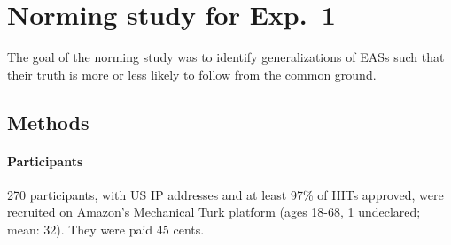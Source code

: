 \documentclass[11pt,fleqn]{article}
\newcommand{\6}{\mbox{$[\hspace*{-.6mm}[$}}
\newcommand{\9}{\mbox{$]\hspace*{-.6mm}]$}}
\begin{document}
%
%
%
%
%
%
%
%
%
%


\section{Norming study for Exp.~1}\label{a-norming}

The goal of the norming study was to identify generalizations of EASs such that their truth is more or less likely to follow from the common ground. 

\subsection{Methods}

\paragraph{Participants} 270 participants, with US IP addresses and at least 97\% of HITs approved, were recruited on Amazon's Mechanical Turk platform (ages 18-68, 1 undeclared; mean: 32). They were paid 45 cents.
\end{document}
